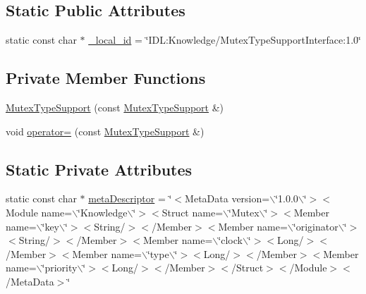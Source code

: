 \subsection*{Static Public Attributes}
\begin{DoxyCompactItemize}
\item 
static const char $\ast$ \hyperlink{classKnowledge_1_1MutexTypeSupportInterface_aec95feffd553260da137b77eac94de1c}{\_\-local\_\-id} = \char`\"{}IDL:Knowledge/MutexTypeSupportInterface:1.0\char`\"{}
\end{DoxyCompactItemize}
\subsection*{Private Member Functions}
\begin{DoxyCompactItemize}
\item 
\hyperlink{classKnowledge_1_1MutexTypeSupport_a9459b93b564509f04f1152c9f4000e12}{MutexTypeSupport} (const \hyperlink{classKnowledge_1_1MutexTypeSupport}{MutexTypeSupport} \&)
\item 
void \hyperlink{classKnowledge_1_1MutexTypeSupport_a0e65fd24541ed12f781f9332f0b5e38a}{operator=} (const \hyperlink{classKnowledge_1_1MutexTypeSupport}{MutexTypeSupport} \&)
\end{DoxyCompactItemize}
\subsection*{Static Private Attributes}
\begin{DoxyCompactItemize}
\item 
static const char $\ast$ \hyperlink{classKnowledge_1_1MutexTypeSupport_a336a3aef8ac28553093abaf96b2a7d81}{metaDescriptor} = \char`\"{}$<$MetaData version=$\backslash$\char`\"{}1.0.0$\backslash$\char`\"{}$>$$<$Module name=$\backslash$\char`\"{}Knowledge$\backslash$\char`\"{}$>$$<$Struct name=$\backslash$\char`\"{}Mutex$\backslash$\char`\"{}$>$$<$Member name=$\backslash$\char`\"{}key$\backslash$\char`\"{}$>$$<$String/$>$$<$/Member$>$$<$Member name=$\backslash$\char`\"{}originator$\backslash$\char`\"{}$>$$<$String/$>$$<$/Member$>$$<$Member name=$\backslash$\char`\"{}clock$\backslash$\char`\"{}$>$$<$Long/$>$$<$/Member$>$$<$Member name=$\backslash$\char`\"{}type$\backslash$\char`\"{}$>$$<$Long/$>$$<$/Member$>$$<$Member name=$\backslash$\char`\"{}priority$\backslash$\char`\"{}$>$$<$Long/$>$$<$/Member$>$$<$/Struct$>$$<$/Module$>$$<$/MetaData$>$\char`\"{}
\end{DoxyCompactItemize}


